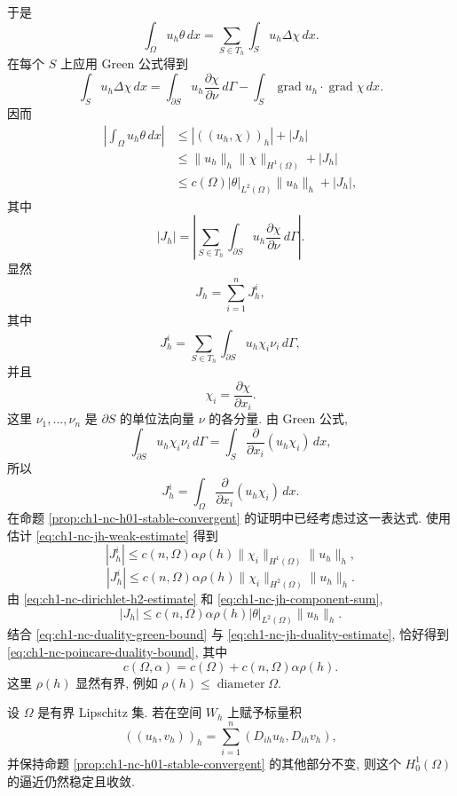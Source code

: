 \begin{Proof}
于是
\[
\int_\Omega u_h\theta\,dx
=\sum_{S\in T_h}\int_Su_h\Delta\chi\,dx.
\]
在每个 $S$ 上应用 Green 公式得到
\[
\int_Su_h\Delta\chi\,dx
=\int_{\partial S}u_h\frac{\partial\chi}{\partial\nu}\,d\Gamma
-\int_S\operatorname{grad}u_h\cdot\operatorname{grad}\chi\,dx.
\]
因而
\begin{equation}
\begin{aligned}
\left|\int_\Omega u_h\theta\,dx\right|
&\leq|((u_h,\chi))_h|+|J_h|\\
&\leq\|u_h\|_h\|\chi\|_{H^1(\Omega)}+|J_h|\\
&\leq c(\Omega)|\theta|_{L^2(\Omega)}\|u_h\|_h+|J_h|,
\end{aligned}
\label{eq:ch1-nc-duality-green-bound}
\end{equation}
其中
\[
|J_h|=\left|\sum_{S\in T_h}\int_{\partial S}
u_h\frac{\partial\chi}{\partial\nu}\,d\Gamma\right|.
\]
显然
\begin{equation}
J_h=\sum_{i=1}^nJ_h^i,
\label{eq:ch1-nc-jh-component-sum}
\end{equation}
其中
\[
J_h^i=\sum_{S\in T_h}\int_{\partial S}u_h\chi_i\nu_i\,d\Gamma,
\]
并且
\begin{equation}
\chi_i=\frac{\partial\chi}{\partial x_i}.
\label{eq:ch1-nc-chi-component}
\end{equation}
这里 $\nu_1,\ldots,\nu_n$ 是 $\partial S$ 的单位法向量 $\nu$ 的各分量. 由 Green 公式,
\[
\int_{\partial S}u_h\chi_i\nu_i\,d\Gamma
=\int_S\frac{\partial}{\partial x_i}(u_h\chi_i)\,dx,
\]
所以
\[
J_h^i=\int_\Omega\frac{\partial}{\partial x_i}(u_h\chi_i)\,dx.
\]
在命题 \ref{prop:ch1-nc-h01-stable-convergent} 的证明中已经考虑过这一表达式. 使用估计 \eqref{eq:ch1-nc-jh-weak-estimate} 得到
\[
|J_h^i|\leq c(n,\Omega)\alpha\rho(h)
\|\chi_i\|_{H^1(\Omega)}\|u_h\|_h,
\]
\[
|J_h^i|\leq c(n,\Omega)\alpha\rho(h)
\|\chi_i\|_{H^2(\Omega)}\|u_h\|_h.
\]
由 \eqref{eq:ch1-nc-dirichlet-h2-estimate} 和 \eqref{eq:ch1-nc-jh-component-sum},
\begin{equation}
|J_h|\leq c(n,\Omega)\alpha\rho(h)
|\theta|_{L^2(\Omega)}\|u_h\|_h.
\label{eq:ch1-nc-jh-duality-estimate}
\end{equation}
结合 \eqref{eq:ch1-nc-duality-green-bound} 与 \eqref{eq:ch1-nc-jh-duality-estimate}, 恰好得到 \eqref{eq:ch1-nc-poincare-duality-bound}, 其中
\[
c(\Omega,\alpha)=c(\Omega)+c(n,\Omega)\alpha\rho(h).
\]
这里 $\rho(h)$ 显然有界, 例如 $\rho(h)\leq\operatorname{diameter}\Omega$.
\end{Proof}

\begin{Proposition}
\label{prop:ch1-nc-h01-gradient-product}
设 $\Omega$ 是有界 Lipschitz 集. 若在空间 $W_h$ 上赋予标量积
\begin{equation}
((u_h,v_h))_h=\sum_{i=1}^n(D_{ih}u_h,D_{ih}v_h),
\label{eq:ch1-nc-wh-gradient-product}
\end{equation}
并保持命题 \ref{prop:ch1-nc-h01-stable-convergent} 的其他部分不变, 则这个 $H_0^1(\Omega)$ 的逼近仍然稳定且收敛.
\end{Proposition}

